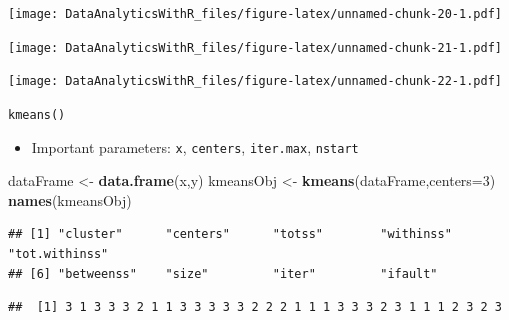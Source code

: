 \documentclass[
]{book}
\newenvironment{Shaded}{\begin{snugshade}}{\end{snugshade}}
\newcommand{\DataTypeTok}[1]{\textcolor[rgb]{0.13,0.29,0.53}{#1}}
\newcommand{\DecValTok}[1]{\textcolor[rgb]{0.00,0.00,0.81}{#1}}
\newcommand{\FloatTok}[1]{\textcolor[rgb]{0.00,0.00,0.81}{#1}}
\newcommand{\KeywordTok}[1]{\textcolor[rgb]{0.13,0.29,0.53}{\textbf{#1}}}
\newcommand{\NormalTok}[1]{#1}
\newcommand{\OperatorTok}[1]{\textcolor[rgb]{0.81,0.36,0.00}{\textbf{#1}}}
\newcommand{\StringTok}[1]{\textcolor[rgb]{0.31,0.60,0.02}{#1}}
\providecommand{\tightlist}{%
  \setlength{\itemsep}{0pt}\setlength{\parskip}{0pt}}
\begin{document}
\texttt{[image: DataAnalyticsWithR\_files/figure-latex/unnamed-chunk-20-1.pdf]}

\texttt{[image: DataAnalyticsWithR\_files/figure-latex/unnamed-chunk-21-1.pdf]}

\texttt{[image: DataAnalyticsWithR\_files/figure-latex/unnamed-chunk-22-1.pdf]}

\texttt{kmeans()}

\begin{itemize}
\tightlist
\item
  Important parameters: \texttt{x}, \texttt{centers}, \texttt{iter.max}, \texttt{nstart}
\end{itemize}

\begin{Shaded}
\begin{Highlighting}[]
\NormalTok{dataFrame <-}\StringTok{ }\KeywordTok{data.frame}\NormalTok{(x,y)}
\NormalTok{kmeansObj <-}\StringTok{ }\KeywordTok{kmeans}\NormalTok{(dataFrame,}\DataTypeTok{centers=}\DecValTok{3}\NormalTok{)}
\KeywordTok{names}\NormalTok{(kmeansObj)}
\end{Highlighting}
\end{Shaded}

\begin{verbatim}
## [1] "cluster"      "centers"      "totss"        "withinss"     "tot.withinss"
## [6] "betweenss"    "size"         "iter"         "ifault"
\end{verbatim}

\begin{Shaded}
\end{Shaded}

\begin{verbatim}
##  [1] 3 1 3 3 3 2 1 1 3 3 3 3 3 2 2 2 1 1 1 3 3 3 2 3 1 1 1 2 3 2 3
\end{verbatim}

\begin{Shaded}
\end{Shaded}
\end{document}
